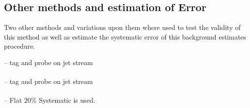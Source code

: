 \subsection{Other methods and estimation of Error}


Two other methods and variations upon them where used to test the validity of this method as well as estimate the systematic error of this background estimates procedure. 

-- tag and probe on jet stream\\
\\
-- tag and probe on jet stream\\
\\
-- Flat $20\%$ Systematic is used.\\










